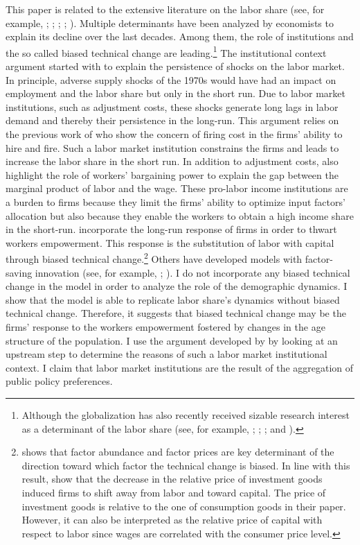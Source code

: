This paper is related to the extensive literature on the labor share (see, for example, \citealt{Blanchard1997}; \citealt{Caballero1998}; \citealt{Acemoglu2003}; \citealt{Karabarbounis2014}; \citealt{Autor2019}). Multiple determinants have been analyzed by economists to explain its decline over the last decades. Among them, the role of institutions and the so called biased technical change are leading.\footnote{Although the globalization has also recently received sizable research interest as a determinant of the labor share (see, for example, \citealt{Jayadev2007}; \citealt{Pica2010}; \citealt{Young2018}; and \citealt{Autor2019}).}
The institutional context argument started with \cite{Blanchard1997} to explain the persistence of shocks on the labor market. In principle, adverse supply shocks of the 1970s would have had an impact on employment and the labor share but only in the short run. Due to labor market institutions, such as adjustment costs, these shocks generate long lags in labor demand and thereby their persistence in the long-run. This argument relies on the previous work of \cite{Bentolila1990} who show the concern of firing cost in the firms' ability to hire and fire. Such a labor market institution constrains the firms and leads to increase the labor share in the short run. In addition to adjustment costs, \cite{Bentolila2003} also highlight the role of workers' bargaining power to explain the gap between the marginal product of labor and the wage.
These pro-labor income institutions are a burden to firms because they limit the firms' ability to optimize input factors' allocation but also because they enable the workers to obtain a high income share in the short-run. \cite{Caballero1998} incorporate the long-run response of firms in order to thwart workers empowerment. This response is the substitution of labor with capital through biased technical change.\footnote{\cite{Acemoglu2002} shows that factor abundance and factor prices are key determinant of the direction toward which factor the technical change is biased. In line with this result, \cite{Karabarbounis2014} show that the decrease in the relative price of investment goods induced firms to shift away from labor and toward capital. The price of investment goods is relative to the one of consumption goods in their paper. However, it can also be interpreted as the relative price of capital with respect to labor since wages are correlated with the consumer price level.} Others have developed models with factor-saving innovation (see, for example, \citealt{Zuleta2008}; \citealt{Peretto2013}).
I do not incorporate any biased technical change in the model in order to analyze the role of the demographic dynamics. I show that the model is able to replicate labor share's dynamics without biased technical change. Therefore, it suggests that biased technical change may be the firms' response to the workers empowerment fostered by changes in the age structure of the population. I use the argument developed by \cite{Caballero1998} by looking at an upstream step to determine the reasons of such a labor market institutional context. I claim that labor market institutions are the result of the aggregation of public policy preferences.


